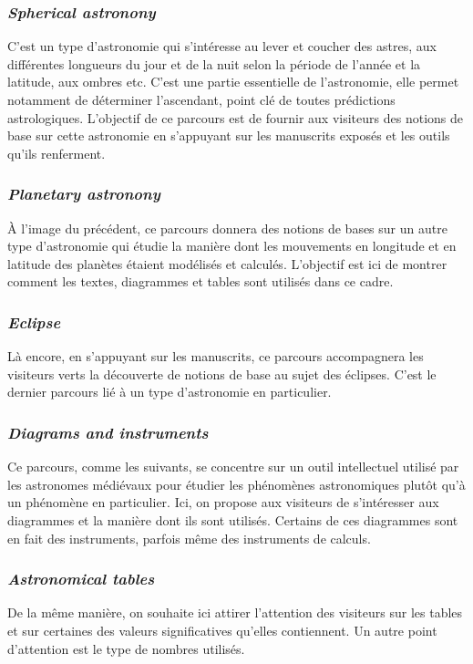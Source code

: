 	\subsubsection{\textit{Spherical astronony}}
	C'est un type d'astronomie qui s’intéresse au lever et coucher des astres, aux différentes longueurs du jour et de la nuit selon la période de l’année et la latitude, aux ombres etc. C’est une partie essentielle de l’astronomie, elle permet notamment de déterminer l’ascendant, point clé de toutes prédictions astrologiques. L'objectif de ce parcours est de fournir aux visiteurs des notions de base sur cette astronomie en s'appuyant sur les manuscrits exposés et les outils qu'ils renferment. 

	\subsubsection{\textit{Planetary astronony}}
	À l'image du précédent, ce parcours donnera des notions de bases sur un autre type d'astronomie qui étudie la manière dont les mouvements en longitude et en latitude des planètes étaient modélisés et calculés. L'objectif est ici de montrer comment les textes, diagrammes et tables sont utilisés dans ce cadre.
	
	\subsubsection{\textit{Eclipse}}
	Là encore, en s'appuyant sur les manuscrits, ce parcours accompagnera les visiteurs verts la découverte de notions de base au sujet des éclipses. C'est le dernier parcours lié à un type d'astronomie en particulier.
	
	\subsubsection{\textit{Diagrams and instruments}}
	Ce parcours, comme les suivants, se concentre sur un outil intellectuel utilisé par les astronomes médiévaux pour étudier les phénomènes astronomiques plutôt qu'à un phénomène en particulier. Ici, on propose aux visiteurs de s'intéresser aux diagrammes et la manière dont ils sont utilisés. Certains de ces diagrammes sont en fait des instruments, parfois même des instruments de calculs.

	\subsubsection{\textit{Astronomical tables}}
	De la même manière, on souhaite ici attirer l'attention des visiteurs sur les tables et sur certaines des valeurs significatives qu’elles contiennent. Un autre point d'attention est le type de nombres utilisés.

